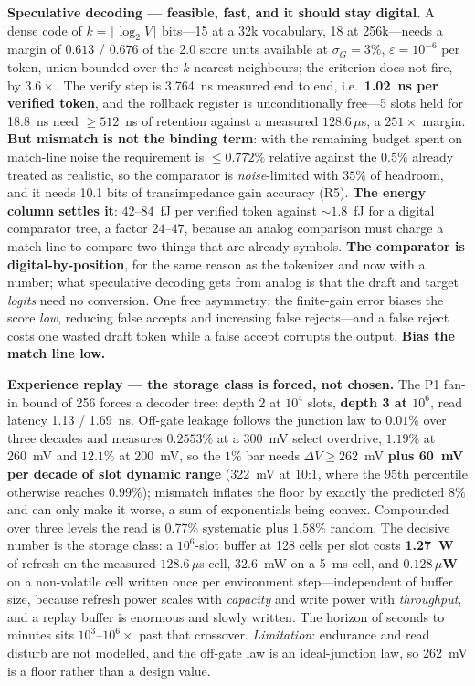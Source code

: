\documentclass[11pt]{article}
\begin{document}
\textbf{Speculative decoding --- feasible, fast, and it should stay digital.} A dense code of $k = \lceil\log_2 V\rceil$ bits---15 at a 32k vocabulary, 18 at 256k---needs a margin of $0.613$ / $0.676$ of the 2.0 score units available at $\sigma_G = 3\%$, $\varepsilon = 10^{-6}$ per token, union-bounded over the $k$ nearest neighbours; the criterion does not fire, by $3.6\times$. The verify step is 3.764~ns measured end to end, i.e.\ \textbf{1.02~ns per verified token}, and the rollback register is unconditionally free---5 slots held for 18.8~ns need $\ge512$~ns of retention against a measured $128.6\,\mu$s, a $251\times$ margin. \textbf{But mismatch is not the binding term}: with the remaining budget spent on match-line noise the requirement is $\le0.772\%$ relative against the $0.5\%$ already treated as realistic, so the comparator is \textit{noise}-limited with $35\%$ of headroom, and it needs 10.1 bits of transimpedance gain accuracy (R5). \textbf{The energy column settles it}: $42$--$84$~fJ per verified token against ${\sim}1.8$~fJ for a digital comparator tree, a factor $24$--$47$, because an analog comparison must charge a match line to compare two things that are already symbols. \textbf{The comparator is digital-by-position}, for the same reason as the tokenizer and now with a number; what speculative decoding gets from analog is that the draft and target \textit{logits} need no conversion. One free asymmetry: the finite-gain error biases the score \textit{low}, reducing false accepts and increasing false rejects---and a false reject costs one wasted draft token while a false accept corrupts the output. \textbf{Bias the match line low.}

\textbf{Experience replay --- the storage class is forced, not chosen.} The P1 fan-in bound of 256 forces a decoder tree: depth 2 at $10^4$ slots, \textbf{depth 3 at $10^6$}, read latency 1.13 / 1.69~ns. Off-gate leakage follows the junction law to $0.01\%$ over three decades and measures $0.2553\%$ at a 300~mV select overdrive, $1.19\%$ at 260~mV and $12.1\%$ at 200~mV, so the $1\%$ bar needs $\Delta V \ge 262$~mV \textbf{plus 60~mV per decade of slot dynamic range} (322~mV at 10:1, where the 95th percentile otherwise reaches $0.99\%$); mismatch inflates the floor by exactly the predicted $8\%$ and can only make it worse, a sum of exponentials being convex. Compounded over three levels the read is $0.77\%$ systematic plus $1.58\%$ random. The decisive number is the storage class: a $10^6$-slot buffer at 128 cells per slot costs \textbf{1.27~W} of refresh on the measured $128.6\,\mu$s cell, 32.6~mW on a 5~ms cell, and \textbf{$0.128\,\mu$W} on a non-volatile cell written once per environment step---independent of buffer size, because refresh power scales with \textit{capacity} and write power with \textit{throughput}, and a replay buffer is enormous and slowly written. The horizon of seconds to minutes sits $10^3$--$10^6\times$ past that crossover. \textit{Limitation}: endurance and read disturb are not modelled, and the off-gate law is an ideal-junction law, so 262~mV is a floor rather than a design value.
\end{document}
